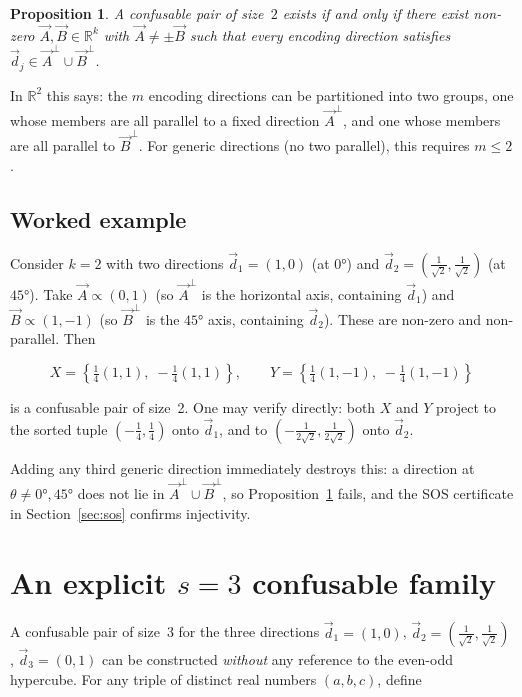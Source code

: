 \documentclass[12pt,a4paper]{article}
\newtheorem{proposition}{Proposition}
\begin{document}
\begin{proposition}
  \label{prop:s2}
  A confusable pair of size~$2$ exists if and only if there exist
  non-zero $\vec{A}, \vec{B} \in \mathbb{R}^k$ with $\vec{A} \neq \pm
  \vec{B}$ such that every encoding direction satisfies
  $\vec{d}_j \in \vec{A}^\perp \cup \vec{B}^\perp$.
\end{proposition}

In $\mathbb{R}^2$ this says: the $m$ encoding directions can be
partitioned into two groups, one whose members are all parallel to a
fixed direction $\vec{A}^\perp$, and one whose members are all parallel
to $\vec{B}^\perp$.  For generic directions (no two parallel), this
requires $m \leq 2$.

\subsection*{Worked example}

Consider $k = 2$ with two directions $\vec{d}_1 = (1, 0)$ (at $0°$) and
$\vec{d}_2 = (\tfrac{1}{\sqrt{2}}, \tfrac{1}{\sqrt{2}})$ (at $45°$).
Take $\vec{A} \propto (0, 1)$ (so $\vec{A}^\perp$ is the horizontal
axis, containing $\vec{d}_1$) and $\vec{B} \propto (1, -1)$ (so
$\vec{B}^\perp$ is the $45°$ axis, containing $\vec{d}_2$).  These are
non-zero and non-parallel.  Then

\[
  X = \left\{\tfrac{1}{4}(1, 1),\; -\tfrac{1}{4}(1, 1)\right\},
  \qquad
  Y = \left\{\tfrac{1}{4}(1, -1),\; -\tfrac{1}{4}(1, -1)\right\}
\]

is a confusable pair of size~2.  One may verify directly:
both $X$ and $Y$ project to the sorted tuple $(-\tfrac{1}{4},
\tfrac{1}{4})$ onto $\vec{d}_1$, and to $(-\tfrac{1}{2\sqrt{2}},
\tfrac{1}{2\sqrt{2}})$ onto $\vec{d}_2$.

Adding any third generic direction immediately destroys this: a
direction at $\theta \neq 0°, 45°$ does not lie in
$\vec{A}^\perp \cup \vec{B}^\perp$, so Proposition~\ref{prop:s2} fails,
and the SOS certificate in Section~\ref{sec:sos} confirms injectivity.

\section{An explicit \texorpdfstring{$s = 3$}{s = 3} confusable family}
\label{sec:cyclic}

A confusable pair of size~3 for the three directions
$\vec{d}_1 = (1, 0)$, $\vec{d}_2 = (\tfrac{1}{\sqrt{2}},
\tfrac{1}{\sqrt{2}})$, $\vec{d}_3 = (0, 1)$ can be constructed
\emph{without} any reference to the even-odd hypercube.  For any triple
of distinct real numbers $(a, b, c)$, define
\end{document}
